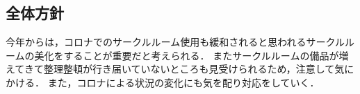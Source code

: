\subsection*{全体方針}


今年からは，コロナでのサークルルーム使用も緩和されると思われるサークルルームの美化をすることが重要だと考えられる．
またサークルルームの備品が増えてきて整理整頓が行き届いていないところも見受けられるため，注意して気にかける．
また，コロナによる状況の変化にも気を配り対応をしていく．
